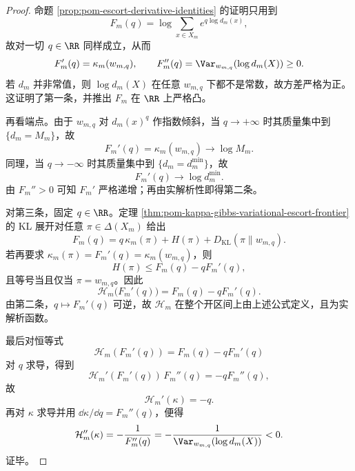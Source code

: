 \begin{proof}
命题 \ref{prop:pom-escort-derivative-identities} 的证明只用到
\[
F_m(q)=\log\sum_{x\in X_m}e^{q\log d_m(x)},
\]
故对一切 \(q\in\RR\) 同样成立，从而
\[
F_m'(q)=\kappa_m(w_{m,q}),
\qquad
F_m''(q)=\Var_{w_{m,q}}(\log d_m(X))\ge 0.
\]
若 \(d_m\) 并非常值，则 \(\log d_m(X)\) 在任意 \(w_{m,q}\) 下都不是常数，故方差严格为正。这证明了第一条，并推出 \(F_m\) 在 \(\RR\) 上严格凸。

再看端点。由于 \(w_{m,q}\) 对 \(d_m(x)^q\) 作指数倾斜，当 \(q\to+\infty\) 时其质量集中到 \(\{d_m=M_m\}\)，故
\[
F_m'(q)=\kappa_m(w_{m,q})\longrightarrow \log M_m.
\]
同理，当 \(q\to-\infty\) 时其质量集中到 \(\{d_m=d_m^{\min}\}\)，故
\[
F_m'(q)\longrightarrow \log d_m^{\min}.
\]
由 \(F_m''>0\) 可知 \(F_m'\) 严格递增；再由实解析性即得第二条。

对第三条，固定 \(q\in\RR\)。定理 \ref{thm:pom-kappa-gibbs-variational-escort-frontier} 的 KL 展开对任意 \(\pi\in\Delta(X_m)\) 给出
\[
F_m(q)=q\,\kappa_m(\pi)+H(\pi)+D_{\mathrm{KL}}(\pi\|w_{m,q}).
\]
若再要求 \(\kappa_m(\pi)=F_m'(q)=\kappa_m(w_{m,q})\)，则
\[
H(\pi)\le F_m(q)-qF_m'(q),
\]
且等号当且仅当 \(\pi=w_{m,q}\)。因此
\[
\mathcal H_m\bigl(F_m'(q)\bigr)=F_m(q)-qF_m'(q).
\]
由第二条，\(q\mapsto F_m'(q)\) 可逆，故 \(\mathcal H_m\) 在整个开区间上由上述公式定义，且为实解析函数。

最后对恒等式
\[
\mathcal H_m(F_m'(q))=F_m(q)-qF_m'(q)
\]
对 \(q\) 求导，得到
\[
\mathcal H_m'(F_m'(q))\,F_m''(q)=-qF_m''(q),
\]
故
\[
\mathcal H_m'(\kappa)=-q.
\]
再对 \(\kappa\) 求导并用 \(\dd\kappa/\dd q=F_m''(q)\)，便得
\[
\mathcal H_m''(\kappa)=-\frac{1}{F_m''(q)}
=-\frac{1}{\Var_{w_{m,q}}(\log d_m(X))}<0.
\]
证毕。
\end{proof}

